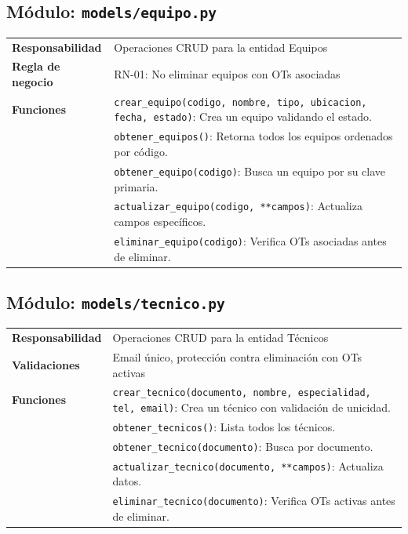 \documentclass[12pt, a4paper]{article}
\begin{document}
\subsection{Módulo: \texttt{models/equipo.py}}

\begin{table}[H]
    \centering
    \begin{tabularx}{\textwidth}{l X}
        \toprule
        \textbf{Responsabilidad} & Operaciones CRUD para la entidad Equipos \\
        \textbf{Regla de negocio} & RN-01: No eliminar equipos con OTs asociadas \\
        \midrule
        \textbf{Funciones} & \texttt{crear\_equipo(codigo, nombre, tipo, ubicacion, fecha, estado)}: Crea un equipo validando el estado. \\
        & \texttt{obtener\_equipos()}: Retorna todos los equipos ordenados por código. \\
        & \texttt{obtener\_equipo(codigo)}: Busca un equipo por su clave primaria. \\
        & \texttt{actualizar\_equipo(codigo, **campos)}: Actualiza campos específicos. \\
        & \texttt{eliminar\_equipo(codigo)}: Verifica OTs asociadas antes de eliminar. \\
        \bottomrule
    \end{tabularx}
\end{table}

\subsection{Módulo: \texttt{models/tecnico.py}}

\begin{table}[H]
    \centering
    \begin{tabularx}{\textwidth}{l X}
        \toprule
        \textbf{Responsabilidad} & Operaciones CRUD para la entidad Técnicos \\
        \textbf{Validaciones} & Email único, protección contra eliminación con OTs activas \\
        \midrule
        \textbf{Funciones} & \texttt{crear\_tecnico(documento, nombre, especialidad, tel, email)}: Crea un técnico con validación de unicidad. \\
        & \texttt{obtener\_tecnicos()}: Lista todos los técnicos. \\
        & \texttt{obtener\_tecnico(documento)}: Busca por documento. \\
        & \texttt{actualizar\_tecnico(documento, **campos)}: Actualiza datos. \\
        & \texttt{eliminar\_tecnico(documento)}: Verifica OTs activas antes de eliminar. \\
        \bottomrule
    \end{tabularx}
\end{table}
\end{document}
